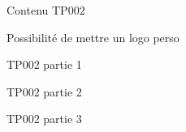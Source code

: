 \begin{TP}
    Contenu TP002
    
    Possibilité de mettre un logo perso
    
    TP002 partie 1
    
    
    TP002 partie 2
    
    
    TP002 partie 3 
\end{TP}